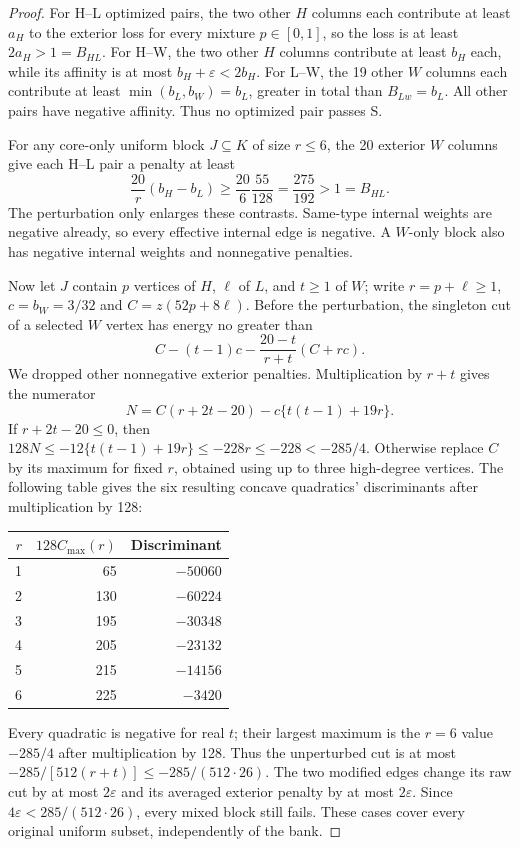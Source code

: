 \documentclass[sigconf,anonymous,review]{acmart}
\newcommand{\1}{\mathbf{1}}
\begin{document}
\begin{proof}
For H--L optimized pairs, the two other $H$ columns each contribute at least
$a_H$ to the exterior loss for every mixture $p\in[0,1]$, so the loss is at
least $2a_H>1=B_{HL}$. For H--W, the two other $H$ columns contribute at
least $b_H$ each, while its affinity is at most $b_H+\varepsilon<2b_H$.
For L--W, the 19 other $W$ columns each contribute at least
$\min(b_L,b_W)=b_L$, greater in total than $B_{Lw}=b_L$.
All other pairs have negative affinity. Thus no optimized pair passes S.

For any core-only uniform block $J\subseteq K$ of size $r\le6$, the 20
exterior $W$ columns give each H--L pair a penalty at least
\[
\frac{20}{r}(b_H-b_L)\ge\frac{20}{6}\frac{55}{128}
  =\frac{275}{192}>1=B_{HL}.
\]
The perturbation only enlarges these contrasts. Same-type internal weights
are negative already, so every effective internal edge is negative.
A $W$-only block also has negative internal weights and nonnegative penalties.

Now let $J$ contain $p$ vertices of $H$, $\ell$ of $L$, and $t\ge1$ of $W$;
write $r=p+\ell\ge1$, $c=b_W=3/32$ and
$C=z(52p+8\ell)$. Before the perturbation, the singleton cut of a selected
$W$ vertex has energy no greater than
\begin{equation}
 C-(t-1)c-\frac{20-t}{r+t}(C+rc).
 \label{eq:connected-witness-singleton}
\end{equation}
We dropped other nonnegative exterior penalties. Multiplication by $r+t$
gives the numerator
\[
N=C(r+2t-20)-c\{t(t-1)+19r\}.
\]
If $r+2t-20\le0$, then
$128N\le-12\{t(t-1)+19r\}\le-228r\le-228<-285/4$.
Otherwise replace $C$ by its maximum for
fixed $r$, obtained using up to three high-degree vertices. The following
table gives the six resulting concave quadratics' discriminants after
multiplication by 128:
\begin{center}\small
\begin{tabular}{rrr}\toprule
$r$ & $128C_{\max}(r)$ & Discriminant\\\midrule
1&65&$-50060$\\
2&130&$-60224$\\
3&195&$-30348$\\
4&205&$-23132$\\
5&215&$-14156$\\
6&225&$-3420$\\\bottomrule
\end{tabular}
\end{center}
Every quadratic is negative for real $t$; their largest maximum is the
$r=6$ value $-285/4$ after multiplication by 128. Thus the unperturbed
cut is at most $-285/[512(r+t)]\le-285/(512\cdot26)$. The two modified
edges change its raw cut by at most $2\varepsilon$ and its averaged
exterior penalty by at most $2\varepsilon$. Since
$4\varepsilon<285/(512\cdot26)$, every mixed block still fails.
These cases cover every original uniform subset, independently of the bank.


\end{proof}
\end{document}
